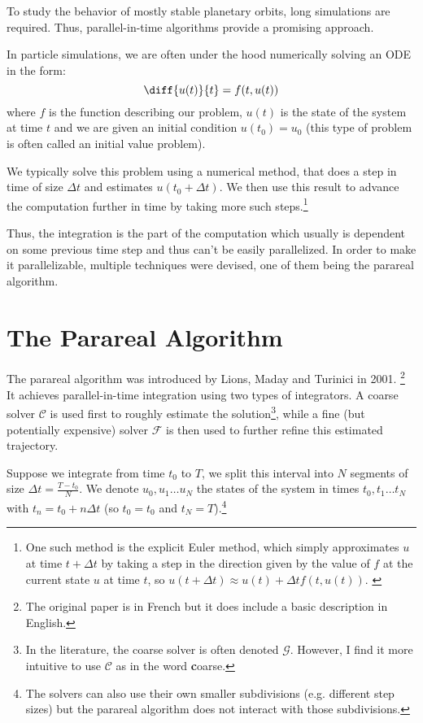 \documentclass[conference]{IEEEtran}
\begin{document}
To study the behavior of mostly stable planetary orbits, long simulations are required. Thus, parallel-in-time algorithms provide a promising approach. \cite{parallelsolar}

In particle simulations, we are often under the hood numerically solving an ODE in the form:
$$
\diff{u(t)}{t} = f(t, u(t))
$$
where $f$ is the function describing our problem, $u(t)$ is the state of the system at time $t$ and we are given an initial condition $u(t_0) = u_0$ (this type of problem is often called an initial value problem).

We typically solve this problem using a numerical method, that does a step in time of size $\Delta t$ and estimates $u(t_0+\Delta t)$. We then use this result to advance the computation further in time by taking more such steps.\footnote{One such method is the explicit Euler method, which simply approximates $u$ at time $t+\Delta t$ by taking a step in the direction given by the value of $f$ at the current state $u$ at time $t$, so $u(t+\Delta t) \approx u(t) + \Delta t f(t, u(t))$. \cite{forrk4}}

Thus, the integration is the part of the computation which usually is dependent on some previous time step and thus can't be easily parallelized. In order to make it parallelizable, multiple techniques were devised, one of them being the parareal algorithm.

\section{The Parareal Algorithm}

The parareal algorithm was introduced by Lions, Maday and Turinici in 2001. \cite{parareal}\footnote{The original paper is in French but it does include a basic description in English.} It achieves parallel-in-time integration using two types of integrators. A coarse solver $\mathcal{C}$ is used first to roughly estimate the solution\footnote{In the literature, the coarse solver is often denoted $\mathcal{G}$. However, I find it more intuitive to use $\mathcal{C}$ as in the word \textbf{c}oarse.}, while a fine (but potentially expensive) solver $\mathcal{F}$ is then used to further refine this estimated trajectory.

Suppose we integrate from time $t_0$ to $T$, we split this interval into $N$ segments of size $\Delta t = \frac{T-t_0}{N}$. We denote $u_0, u_1\dots u_N$ the states of the system in times $t_0, t_1\dots t_N$ with $t_n = t_0 + n\Delta t$ (so $t_0 = t_0$ and $t_N = T$).\footnote{The solvers can also use their own smaller subdivisions (e.g. different step sizes) but the parareal algorithm does not interact with those subdivisions.}
\end{document}
